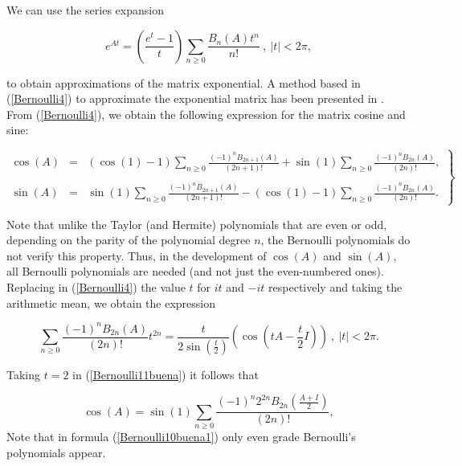 We can use the series expansion

\begin{equation}\label{Bernoulli4}
e^{At} = \left(\frac{e^t-1}{t}\right)\sum_{n \geq 0} \frac{ B_n(A) t^{n}}{n!} \ , \ |t|<2\pi,
\end{equation}

to obtain approximations of the matrix exponential. A method based in (\ref{Bernoulli4}) to approximate the exponential matrix has been presented in \cite{defez2019}.\\

From (\ref{Bernoulli4}), we obtain the following expression for the matrix cosine and sine:

\begin{equation}\label{Bernoulli9buena}
\left.\begin{array}{rcl}
\cos{(A)} &=&\displaystyle  \left( \cos{(1)}-1\right)\sum_{n \geq 0} \frac{(-1)^n B_{2n+1}(A)}{(2n+1)!}+ \sin{(1)}\sum_{n \geq 0} \frac{(-1)^n B_{2n}(A)}{(2n)!}, \\
\\
\sin{(A)} &=& \displaystyle   \sin{(1)}\sum_{n \geq 0} \frac{ (-1)^n B_{2n+1}(A)}{(2n+1)!}-\left(\cos{(1)}-1\right)\sum_{n \geq 0} \frac{ (-1)^n B_{2n}(A)}{(2n)!}.
\end{array} \right\}
\end{equation}

Note that unlike the Taylor (and Hermite) polynomials that are even or odd, depending on the parity of the polynomial degree $n$, the Bernoulli polynomials do not verify this property. Thus,
in the development of $\cos{(A)}$ and $\sin{(A)}$, all Bernoulli polynomials are needed (and not just the even-numbered ones).\\

Replacing in (\ref{Bernoulli4}) the value $t$ for $it$ and $-it$ respectively and taking the arithmetic mean, we obtain the expression

\begin{equation}\label{Bernoulli11buena}
\sum_{n \geq 0} \frac{(-1)^n B_{2n}(A)}{(2n)!}t^{2n} =\frac{t}{2 \sin{\left( \frac{t}{2} \right)}}\left(\cos{\left(t A- \frac{t}{2}I \right)}  \right)  \ , \ |t|<2\pi.
\end{equation}


Taking $t=2$ in (\ref{Bernoulli11buena}) it follows that

\begin{equation}\label{Bernoulli10buena1}
\cos{(A)} = \sin{(1)}\sum_{n \geq 0} \frac{(-1)^n 2^{2n} B_{2n}\left(\frac{A+I}{2}\right)}{(2n)!},
\end{equation}
Note that in formula (\ref{Bernoulli10buena1}) only even grade Bernoulli's polynomials appear.
